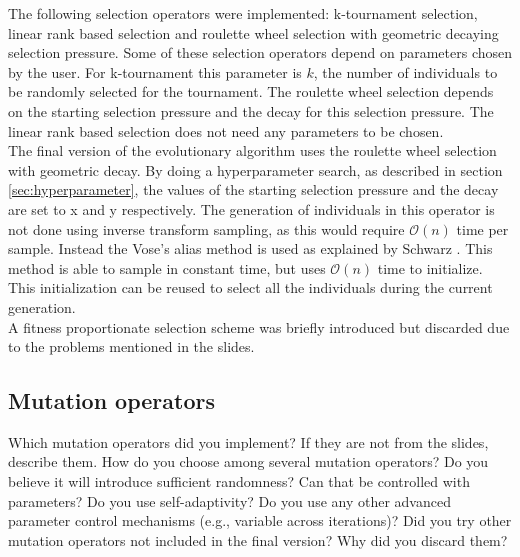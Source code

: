 \documentclass[a4paper,10pt]{article}
\newcommand{\ReplaceMe}[1]{{\color{blue}#1}}
\begin{document}
The following selection operators were implemented: k-tournament selection, linear rank based selection and roulette wheel selection with geometric decaying selection pressure. Some of these selection operators depend on parameters chosen by the user. For k-tournament this parameter is $k$, the number of individuals to be randomly selected for the tournament. The roulette wheel selection depends on the starting selection pressure and the decay for this selection pressure. The linear rank based selection does not need any parameters to be chosen.\\
The final version of the evolutionary algorithm uses the roulette wheel selection with geometric decay. By doing a hyperparameter search, as described in section \ref{sec:hyperparameter}, the values of the starting selection pressure and the decay are set to \ReplaceMe{x and y} respectively. The generation of individuals in this operator is not done using inverse transform sampling, as this would require $\mathcal{O}(n)$ time per sample. Instead the Vose's alias method is used as explained by Schwarz \cite{schwarz, vose}. This method is able to sample in constant time, but uses $\mathcal{O}(n)$ time to initialize. This initialization can be reused to select all the individuals during the current generation.\\
A fitness proportionate selection scheme was briefly introduced but discarded due to the problems mentioned in the slides.

\subsection{Mutation operators}

\ReplaceMe{Which mutation operators did you implement? If they are not from the slides, describe them. How do you choose among several mutation operators? Do you believe it will introduce sufficient randomness? Can that be controlled with parameters? Do you use self-adaptivity? Do you use any other advanced parameter control mechanisms (e.g., variable across iterations)? Did you try other mutation operators not included in the final version? Why did you discard them?}
\end{document}
